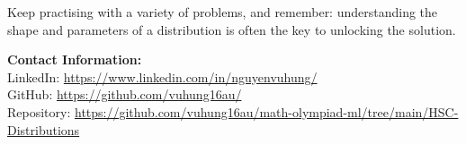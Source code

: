 \documentclass[12pt]{article}
\begin{document}
Keep practising with a variety of problems, and remember: understanding the shape and parameters of a distribution is often the key to unlocking the solution.

\vspace{2em}
\noindent\textbf{Contact Information:}\\[0.5em]
LinkedIn: \href{https://www.linkedin.com/in/nguyenvuhung/}{https://www.linkedin.com/in/nguyenvuhung/}\\[0.3em]
GitHub: \href{https://github.com/vuhung16au/}{https://github.com/vuhung16au/}\\[0.3em]
Repository: \href{https://github.com/vuhung16au/math-olympiad-ml/tree/main/HSC-Distributions}{https://github.com/vuhung16au/math-olympiad-ml/tree/main/HSC-Distributions}

\clearpage
\appendix


\end{document}
